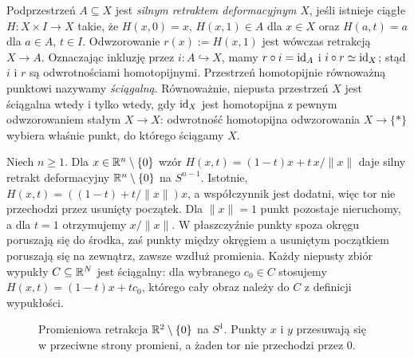 \begin{definicja}
\label{def:retrakt-deformacyjny}
Podprzestrzeń $A\subseteq X$ jest
\emph{silnym retraktem deformacyjnym} $X$,
jeśli istnieje ciągłe $H:X\times I\to X$ takie, że
 $H(x,0)=x$, $H(x,1)\in A$ dla $x\in X$
 oraz $H(a,t)=a$ dla $a\in A$, $t\in I$.
Odwzorowanie $r(x):=H(x,1)$ jest wówczas
retrakcją $X\to A$. Oznaczając inkluzję przez
$i:A\hookrightarrow X$, mamy $r\circ i=\mathrm{id}_A$ i $i\circ r\simeq\mathrm{id}_X$;
stąd $i$ i $r$ są odwrotnościami homotopijnymi.
Przestrzeń homotopijnie równoważną punktowi
nazywamy \emph{ściągalną}. Równoważnie, niepusta
przestrzeń $X$ jest ściągalna wtedy i tylko wtedy,
gdy $\mathrm{id}_X$ jest homotopijna z pewnym odwzorowaniem
stałym $X\to X$: odwrotność homotopijna odwzorowania
$X\to\{*\}$ wybiera właśnie punkt, do którego
ściągamy $X$.
\end{definicja}

\begin{przyklad}
\label{prz:retrakcja-pierscien}
Niech $n\geq1$. Dla $x\in\mathbb{R}^n\setminus\{0\}$ wzór
$H(x,t)=(1-t)x+t\,x/\|x\|$ daje silny retrakt deformacyjny
$\mathbb{R}^n\setminus\{0\}$ na $S^{n-1}$.
Istotnie, $H(x,t)=((1-t)+t/\|x\|)x$, a współczynnik
jest dodatni, więc tor nie przechodzi przez usunięty
początek. Dla $\|x\|=1$ punkt pozostaje nieruchomy,
a dla $t=1$ otrzymujemy $x/\|x\|$. W płaszczyźnie
punkty spoza okręgu poruszają się do środka, zaś
punkty między okręgiem a usuniętym początkiem
poruszają się na zewnątrz, zawsze wzdłuż promienia.
Każdy niepusty zbiór wypukły $C\subseteq\mathbb{R}^N$ jest ściągalny:
dla wybranego $c_0\in C$ stosujemy
$H(x,t)=(1-t)x+tc_0$, którego cały obraz należy
do $C$ z definicji wypukłości.
\end{przyklad}

\begin{figure}[!htbp]
\centering
{}
\caption{Promieniowa retrakcja $\mathbb{R}^2\setminus\{0\}$ na $S^1$.
Punkty $x$ i $y$ przesuwają się w przeciwne strony
promieni, a żaden tor nie przechodzi przez $0$.}
\label{fig:retrakcja-promieniowa}
\end{figure}

